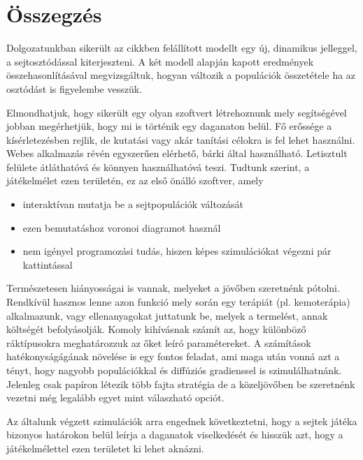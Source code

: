 \chapter{Összegzés}

Dolgozatunkban sikerült az \cite{archetti2016cooperation} cikkben felállított modellt egy új, dinamikus jelleggel, a sejtosztódással kiterjeszteni. A két modell alapján kapott eredmények összehasonlításával megvizsgáltuk, hogyan változik a populációk összetétele ha az osztódást is figyelembe vesszük.

Elmondhatjuk, hogy sikerült egy olyan szoftvert létrehoznunk mely segítségével jobban megérhetjük, hogy mi is történik egy daganaton belül. Fő erőssége a kísérletezésben rejlik, de kutatási vagy akár tanítási célokra is fel lehet használni. Webes alkalmazás révén egyszerűen elérhető, bárki által használható. Letisztult felülete átláthatóvá és könnyen használhatóvá teszi. Tudtunk szerint, a játékelmélet ezen területén, ez az első önálló szoftver, amely 
\begin{itemize}[noitemsep]
	\item interaktívan mutatja be a sejtpopulációk változását
	\item ezen bemutatáshoz voronoi diagramot használ
	\item nem igényel programozási tudás, hiszen képes szimulációkat végezni pár kattintással
\end{itemize}

Természetesen hiányosságai is vannak, melyeket a jövőben szeretnénk pótolni. Rendkívül hasznos lenne azon funkció mely során egy terápiát (pl. kemoterápia) alkalmazunk, vagy ellenanyagokat juttatunk be, melyek a termelést, annak költségét befolyásolják. Komoly kihívásnak számít az, hogy különböző ráktípusokra meghatározzuk az őket leíró paramétereket. A számítások hatékonyságágának növelése is egy fontos feladat, ami maga után vonná azt a tényt, hogy nagyobb populációkkal és diffúziós gradienssel is szimulálhatnánk. 
Jelenleg csak papíron létezik több fajta stratégia \cite{hummert2014evolutionary} de a közeljövőben be szeretnénk vezetni még legalább egyet mint válaszható opciót.

Az általunk végzett szimulációk arra engednek következtetni, hogy a sejtek játéka bizonyos határokon belül leírja a daganatok viselkedését és hisszük azt, hogy a játékelmélettel ezen területet ki lehet aknázni.